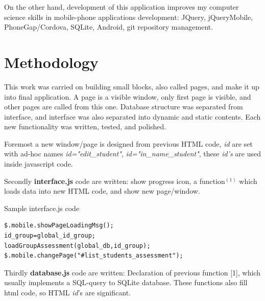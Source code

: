 	On the other hand, development of this application improves my computer science skills in  mobile-phone applications development: JQuery,  jQueryMobile, PhoneGap/Cordova, SQLite, Android,  git repository management.

\section {Methodology}
	This work was carried on building small blocks, also called pages, and make it up into final application.
	A page is a visible window, only first page is visible, and other pages are called from this one.
	 Database structure was separated from interface, and interface was also separated into dynamic and static contents. Each new
	 functionality was written, tested, and
	polished. 
	
	
	Foremost a new window/page  is designed from previous HTML code, \emph{id} are set with ad-hoc names \emph{id="edit\_student"}, 
	   \emph{id="in\_name\_student"},   these \emph{id's} are used inside javascript code. 
	   
    Secondly { \bf interface.js} code are written: show progress icon, a function$^{(1)}$  which loads data into new HTML code, 
    and show new page/window.
\begin{bclogo}[couleur=blue!30,arrondi=0.1,ombre=true ] 
{Sample interface.js code}        
        \begin{verbatim}
$.mobile.showPageLoadingMsg();
id_group=global_id_group; 
loadGroupAssessment(global_db,id_group);
$.mobile.changePage("#list_students_assessment");
    \end{verbatim}  
\end{bclogo}

    Thirdly {\bf database.js} code are written: Declaration of previous function [1], which  usually implements a SQL-query to SQLite database. These functions also fill html code, so HTML \emph{id}'s are significant.
    
